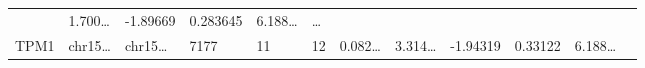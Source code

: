 \documentclass[
]{article}
\begin{document}
\begin{longtable}[]{@{}llllllllllll@{}}
\begin{minipage}[t]{0.06\columnwidth}
\end{minipage} & \begin{minipage}[t]{0.08\columnwidth}\raggedright
1.700\ldots{}\strut
\end{minipage} & \begin{minipage}[t]{0.06\columnwidth}\raggedright
-1.89669\strut
\end{minipage} & \begin{minipage}[t]{0.06\columnwidth}\raggedright
0.283645\strut
\end{minipage} & \begin{minipage}[t]{0.09\columnwidth}\raggedright
6.188\ldots{}\strut
\end{minipage} & \begin{minipage}[t]{0.02\columnwidth}\raggedright
\ldots{}\strut
\end{minipage}\tabularnewline
\begin{minipage}[t]{0.06\columnwidth}\raggedright
TPM1\strut
\end{minipage} & \begin{minipage}[t]{0.06\columnwidth}\raggedright
chr15\ldots{}\strut
\end{minipage} & \begin{minipage}[t]{0.06\columnwidth}\raggedright
chr15\ldots{}\strut
\end{minipage} & \begin{minipage}[t]{0.06\columnwidth}\raggedright
7177\strut
\end{minipage} & \begin{minipage}[t]{0.06\columnwidth}\raggedright
11\strut
\end{minipage} & \begin{minipage}[t]{0.06\columnwidth}\raggedright
12\strut
\end{minipage} & \begin{minipage}[t]{0.06\columnwidth}\raggedright
0.082\ldots{}\strut
\end{minipage} & \begin{minipage}[t]{0.08\columnwidth}\raggedright
3.314\ldots{}\strut
\end{minipage} & \begin{minipage}[t]{0.06\columnwidth}\raggedright
-1.94319\strut
\end{minipage} & \begin{minipage}[t]{0.06\columnwidth}\raggedright
0.33122\strut
\end{minipage} & \begin{minipage}[t]{0.09\columnwidth}\raggedright
6.188\ldots{}\strut

\end{minipage}
\end{longtable}
\end{document}
